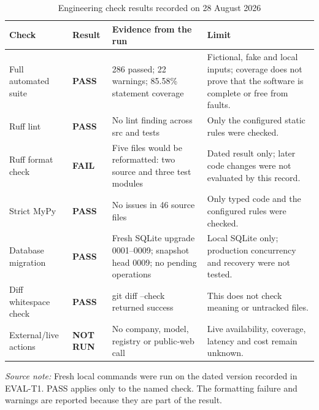 \clearpage
\begin{table}[p]
  \centering
  \scriptsize
  \setlength{\tabcolsep}{4pt}
  \renewcommand{\arraystretch}{1.08}
  \begin{tabularx}{\textwidth}{@{}P{0.20\textwidth}P{0.18\textwidth}P{0.30\textwidth}Y@{}}
    \toprule
    \textbf{Check} & \textbf{Result} & \textbf{Evidence from the run} & \textbf{Limit} \\
    \midrule
    Full automated suite & \textbf{PASS} & 286 passed; 22 warnings; 85.58\% statement coverage & Fictional, fake and local inputs; coverage does not prove that the software is complete or free from faults. \\
    Ruff lint & \textbf{PASS} & No lint finding across \textnormal{src} and \textnormal{tests} & Only the configured static rules were checked. \\
    Ruff format check & \textbf{FAIL} & Five files would be reformatted: two source and three test modules & Dated result only; later code changes were not evaluated by this record. \\
    Strict MyPy & \textbf{PASS} & No issues in 46 source files & Only typed code and the configured rules were checked. \\
    Database migration & \textbf{PASS} & Fresh SQLite upgrade 0001--0009; snapshot head 0009; no pending operations & Local SQLite only; production concurrency and recovery were not tested. \\
    Diff whitespace check & \textbf{PASS} & \textnormal{git diff --check} returned success & This does not check meaning or untracked files. \\
    External/live actions & \textbf{NOT RUN} & No company, model, registry or public-web call & Live availability, coverage, latency and cost remain unknown. \\
    \bottomrule
  \end{tabularx}

  \caption{Engineering check results recorded on 28 August 2026}
  \label{tab:eval-engineering-validation}

  \vspace{4pt}
  \parbox{\textwidth}{\scriptsize
    \textit{Source note:} Fresh local commands were run on the dated version recorded in EVAL-T1. PASS
    applies only to the named check. The formatting failure and warnings are reported because they
    are part of the result.}
\end{table}
\clearpage
